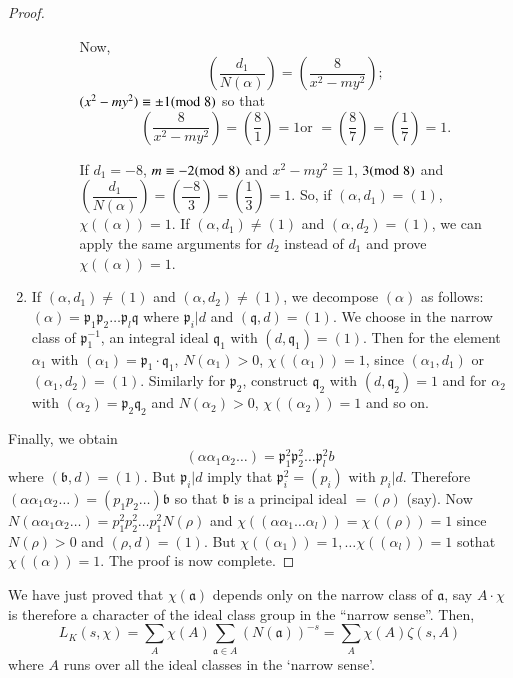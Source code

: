 \begin{proof}
\begin{enumerate}
\begin{enumerate}
\begin{enumerate}
Now,
$$
\left(\dfrac{d_{1}}{N(\alpha)}\right)=\left(\dfrac{8}{x^{2}-my^{2}}\right);
$$
$(x^{2}-my^{2})\equiv \pm 1(\rm{mod} \; 8)$ so that
$$
\left(\frac{8}{x^{2}-my^{2}}\right)=\left(\frac{8}{1}\right)=1\text{
  \ or \ } =\left(\frac{8}{7}\right)=\left(\frac{1}{7}\right)=1. 
$$

If $d_{1}=-8$, $m\equiv -2(\rm{mod} \; 8)$ and $x^{2}-my^{2}\equiv 1$,
$3(\rm{mod} \; 8)$ and
$\left(\dfrac{d_{1}}{N(\alpha)}\right)=\left(\dfrac{-8}{3}\right)=\left(\dfrac{1}{3}\right)=1$. So,
if $(\alpha,d_{1})=(1)$, $\chi((\alpha))=1$. If $(\alpha,d_{1})\neq
(1)$ and $(\alpha,d_{2})=(1)$, we can apply the same arguments for
$d_{2}$ instead of $d_{1}$ and prove $\chi((\alpha))=1$.
\end{enumerate}
\end{enumerate}

\item If $(\alpha,d_{1})\neq (1)$ and $(\alpha,d_{2})\neq (1)$, we decompose $(\alpha)$ as follows: $(\alpha)=\mathfrak{p}_{1}\mathfrak{p}_{2}\ldots \mathfrak{p}_{l}\mathfrak{q}$ where $\mathfrak{p}_{i}|d$ and $(\mathfrak{q},d)=(1)$. We choose in the narrow class of $\mathfrak{p}^{-1}_{1}$, an integral ideal $\mathfrak{q}_{1}$ with $(d,\mathfrak{q}_{1})=(1)$. Then for the element $\alpha_{1}$ with $(\alpha_{1})=\mathfrak{p}_{1}\cdot\mathfrak{q}_{1}$, $N(\alpha_{1})>0$, $\chi((\alpha_{1}))=1$, since $(\alpha_{1},d_{1})$ or $(\alpha_{1},d_{2})=(1)$. Similarly for $\mathfrak{p}_{2}$, construct $\mathfrak{q}_{2}$ with $(d,\mathfrak{q}_{2})=1$ and for $\alpha_{2}$ with $(\alpha_{2})=\mathfrak{p}_{2}\mathfrak{q}_{2}$ and $N(\alpha_{2})>0$, $\chi((\alpha_{2}))=1$ and so on.
\end{enumerate}

Finally, we obtain
$$
(\alpha\alpha_{1}\alpha_{2}\ldots) = \mathfrak{p}^{2}_{1}
\mathfrak{p}^{2}_{2} \ldots\mathfrak{p}^{2}_{l} b
$$
where $(\mathfrak{b},d)=(1)$. But $\mathfrak{p}_{i}|d$ imply that
$\mathfrak{p}^{2}_{i}=(p_{i})$ with $p_{i}|d$. Therefore
$(\alpha\alpha_{1}\alpha_{2}\ldots)=(p_{1}p_{2}\ldots)\mathfrak{b}$ so
that $\mathfrak{b}$ is a principal ideal $=(\rho)$ (say). Now
$N(\alpha\alpha_{1}\alpha_{2}\ldots)=p^{2}_{1}p^{2}_{2}\ldots
p^{2}_{1}N(\rho)$ and
$\chi((\alpha\alpha_{1}\ldots\alpha_{l}))=\chi((\rho))=1$ since
$N(\rho)>0$ and $(\rho,d)=(1)$. But $\chi((\alpha_{1}))=1,\ldots
\chi((\alpha_{l}))=1$  so\pageoriginale that $\chi((\alpha))=1$. The
proof is now complete. 
\end{proof}

We have just proved that $\chi(\mathfrak{a})$ depends only on the
narrow class of $\mathfrak{a}$, say $A\cdot \chi$ is therefore a
character of the ideal class group in the ``narrow sense''. Then,
\begin{equation*}
L_{K}(s,\chi)=\sum_{A}\chi(A)\sum_{\mathfrak{a}\in
  A}(N(\mathfrak{a}))^{-s}=\sum_{A}\chi(A)\zeta(s,A)\tag{67}\label{67} 
\end{equation*}
where $A$ runs over all the ideal classes in the `narrow sense'.

